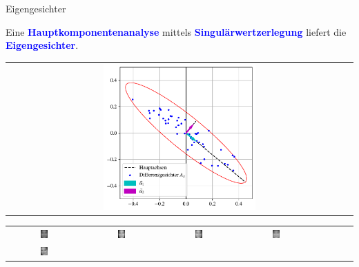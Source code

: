 \documentclass[10pt,aspectratio=169]{beamer}
\begin{document}
\begin{frame}[fragile]{Eigengesichter}
	\begin{center}
		Eine \textcolor{blue}{\textbf{Hauptkomponentenanalyse}} mittels \textcolor{blue}{\textbf{Singulärwertzerlegung}} liefert die \textcolor{blue}{\textbf{Eigengesichter}}.
	\end{center}
	\begin{tabular}{c}
		\includegraphics[width=0.45\textwidth]{images/facespace/principal_components}
	\end{tabular}
	\begin{tabular}{cccccccc}
		\includegraphics[width=0.095\textwidth]{images/eigenfaces/eigenface00} & \includegraphics[width=0.095\textwidth]{images/eigenfaces/eigenface01} &
		\includegraphics[width=0.095\textwidth]{images/eigenfaces/eigenface02} & \includegraphics[width=0.095\textwidth]{images/eigenfaces/eigenface03} \\
		\includegraphics[width=0.095\textwidth]{images/eigenfaces/eigenface04} &

\end{tabular}
\end{frame}
\end{document}
